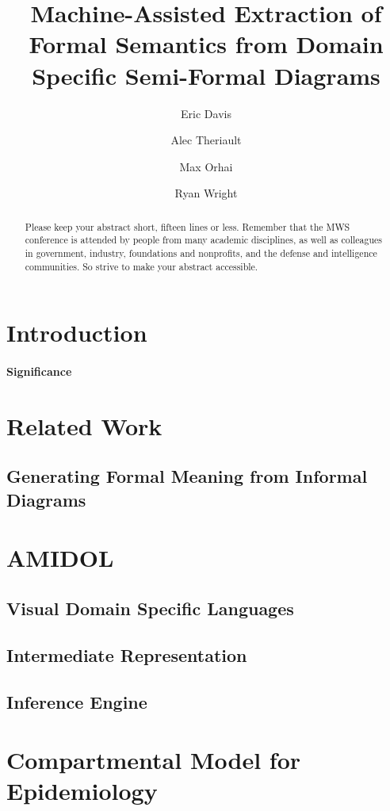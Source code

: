 \documentclass[11pt]{article}
\date{\vspace{-5ex}}
\author[1]{Eric Davis}
\author[1]{Alec Theriault}
\author[1]{Max Orhai}
\author[1]{Ryan Wright}
\affil[1]{Galois, Inc}
\title{Machine-Assisted Extraction of Formal Semantics from Domain Specific Semi-Formal Diagrams}
\begin{document}
\maketitle
\vspace{10pt}
\begin{abstract}
Please keep your abstract short, fifteen lines or less.  Remember that the MWS conference is attended by people from many academic disciplines, as well as colleagues in government, industry, foundations and nonprofits, and the defense and intelligence communities.  So strive to make your abstract accessible.
\end{abstract}

\section{Introduction}

\paragraph{Significance}

\section{Related Work}

\subsection{Generating Formal Meaning from Informal Diagrams}

\section{AMIDOL}

\subsection{Visual Domain Specific Languages}

\subsection{Intermediate Representation}

\subsection{Inference Engine}

\section{Compartmental Model for Epidemiology}
\end{document}
